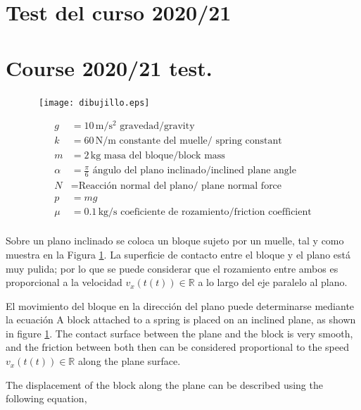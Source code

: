 \begin{paracol}{2}
\section{Test del curso 2020/21}
\switchcolumn
\section{Course 2020/21 test.}
\end{paracol}
\begin{figure}[h]
\begin{minipage}{0.5\textwidth} \ 
\texttt{[image: dibujillo.eps]}
\end{minipage}
\begin{minipage}{0.5\textwidth}
\begin{align*}
g &= 10 \, \text{m}/\text{s}^2 \text{\ gravedad/gravity}\\
k &= 60 \, \text{N}/\text{m} \text{\ constante del muelle/ spring constant}\\
m &= 2 \, \text{kg} \text{\ masa del bloque/block mass}\\
\alpha &= \frac{\pi}{6} \text{\ ángulo del plano inclinado/inclined plane angle}\\
N &= \text{Reacción normal del plano/ plane normal force}\\
p &= mg\\
	\mu &= 0.1 \, \text{kg}/\text{s} \text{\ coeficiente de rozamiento/friction coefficient}\\
\end{align*}

\end{minipage}
\label{fig1}
\end{figure}
\begin{paracol}{2}
Sobre un plano inclinado se coloca un bloque sujeto por un muelle, tal y como muestra en la Figura \ref{fig1}. La superficie de contacto entre el bloque y el plano está muy pulida; por lo que se puede considerar que el rozamiento entre ambos es proporcional a la velocidad $v_x(t(t))\in\mathbb{R}$ a lo largo del eje paralelo al plano.

El movimiento del bloque en la dirección del plano puede determinarse mediante la ecuación
\switchcolumn
A block attached to a spring is placed on an inclined plane, as shown in figure \ref{fig1}. The contact surface between the plane and the block is very smooth, and the friction between both then can be considered proportional to the speed $v_x(t(t))\in\mathbb{R}$ along the plane surface.

The displacement of the block along the plane can be described using the following equation,
\end{paracol}
